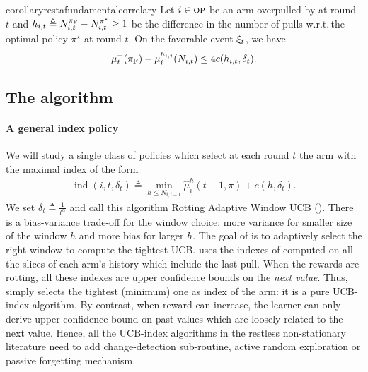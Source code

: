 \begin{restatable}{corollary}{restafundamentalcorrelary}\label{fundamental-correlary}
	Let $i \in \textsc{op}$ be an arm overpulled by {\FEWA} at round $t$ and $h_{i,t} \triangleq N_{i, t}^{\pi_{\rm F}} - N_{i, t}^{\pi^\star} \geq 1$ be the difference in the number of pulls w.r.t.\,the optimal policy $\pi^\star$ at round $t$. On the favorable event $\xi_t$,  we  have
	\begin{align}
	\mu^+_t(\pi_{\rm F}) - \overline{\mu}^{h_{i,t}}_i(N_{i,t}) \leq  4 c(h_{i,t}, \delta_t).
	\end{align}
\end{restatable}


\subsection{The {\EUCB} algorithm}
\label{sec:algo}


\paragraph{A general index policy}
We will study a single class of policies which select at each round $t$ the arm with the maximal index of the form
\vspace{-4pt}
\begin{align}
\label{eq:xindex}
\operatorname{ind}(i,t, \delta_{t}) \triangleq \min_{h\leq N_{i,t-1}} {\widehat{\mu}_i^h(t-1,\pi) + c(h,\delta_{t})}.
\end{align}
We set $\delta_{t} \triangleq \frac{1}{t^\alpha}$ and  call this algorithm Rotting Adaptive Window UCB (\EUCB). There is  a bias-variance trade-off for the window choice: more variance for smaller size of the window $h$ and more bias for larger $h$. The goal of \XUCB is to adaptively select the right window to compute the tightest UCB. \XUCB uses the indexes of \UCBone computed on all the slices of each arm's history which include the last pull. When the rewards are rotting, all these indexes are upper confidence bounds on the \textit{next value}.  Thus, \XUCB simply selects the tightest (minimum) one as index of the arm: it is a pure UCB-index algorithm. By contrast, when reward can increase, the learner can only derive upper-confidence bound on past values which are loosely related to the next value. Hence, all the UCB-index algorithms in the restless non-stationary literature need to add change-detection sub-routine, active random exploration or passive forgetting mechanism. 

